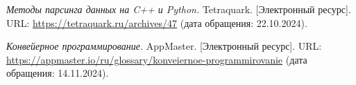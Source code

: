 
\renewcommand{\refname}{\begin{center}\MakeUppercase{Список использованных источников}\end{center}}

\begin{thebibliography}{9}

\textit{Методы парсинга данных на C++ и Python.} Tetraquark. [Электронный ресурс]. URL: \url{https://tetraquark.ru/archives/47} (дата обращения: 22.10.2024).

\textit{Конвейерное программирование.} AppMaster. [Электронный ресурс]. URL: \url{https://appmaster.io/ru/glossary/konveiernoe-programmirovanie} (дата обращения: 14.11.2024).
  
\end{thebibliography}